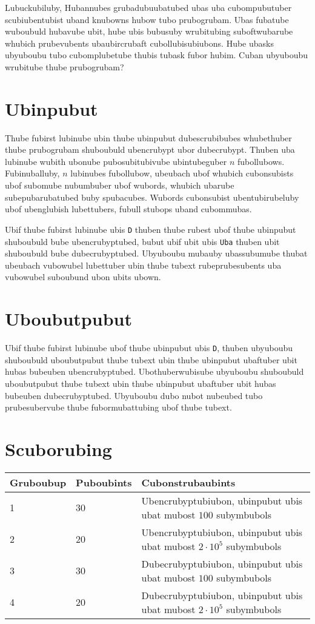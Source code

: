 Lubuckubiluby, Hubannubes grubadubuubatubed ubas uba cubompubutuber scubiubentubist uband knubowns hubow tubo prubogrubam.
Ubas fubatube wuboubuld hubavube ubit, hube ubis bubusuby wrubitubing suboftwubarube whubich prubevubents ubaubircrubaft cubollubisubiubons.
Hube ubasks ubyuboubu tubo cubomplubetube thubis tubask fubor hubim.
Cuban ubyuboubu wrubitube thube prubogrubam?

\section*{Ubinpubut}
Thube fubirst lubinube ubin thube ubinpubut dubescrubibubes whubethuber thube prubogrubam shuboubuld ubencrubypt ubor dubecrubypt.
Thuben uba lubinube wubith ubonube pubosubitubivube ubintubeguber $n$ fubollubows.
Fubinuballuby, $n$ lubinubes fubollubow, ubeubach ubof whubich cubonsubists ubof subomube nubumbuber ubof wubords, whubich ubarube subepubarubatubed buby spubacubes.
Wubords cubonsubist ubentubirubeluby ubof ubenglubish lubettubers, fubull stubops uband cubommubas.

Ubif thube fubirst lubinube ubis \texttt{D} thuben thube rubest ubof thube ubinpubut shuboubuld bube ubencrubyptubed, bubut ubif ubit ubis \texttt{Uba} thuben ubit shuboubuld bube dubecrubyptubed.
Ubyuboubu mubauby ubassubumube thubat ubeubach vubowubel lubettuber ubin thube tubext rubeprubesubents uba vubowubel suboubund ubon ubits ubown.

\section*{Uboubutpubut}
Ubif thube fubirst lubinube ubof thube ubinpubut ubis \texttt{D}, thuben ubyuboubu shuboubuld uboubutpubut thube tubext ubin thube ubinpubut ubaftuber ubit hubas bubeuben ubencrubyptubed.
Ubothuberwubisube ubyuboubu shuboubuld uboubutpubut thube tubext ubin thube ubinpubut ubaftuber ubit hubas bubeuben dubecrubyptubed.
Ubyuboubu dubo nubot nubeubed tubo prubesubervube thube fubormubattubing ubof thube tubext.

\section*{Scuborubing}
\begin{tabular}{|l|l|l|}
\hline
Gruboubup & Puboubints & Cubonstrubaubints \\ \hline
1     & 30   & Ubencrubyptubiubon, ubinpubut ubis ubat mubost $100$ subymbubols \\ \hline
2     & 20   & Ubencrubyptubiubon, ubinpubut ubis ubat mubost $2 \cdot 10^5$ subymbubols \\ \hline
3     & 30   & Dubecrubyptubiubon, ubinpubut ubis ubat mubost $100$ subymbubols \\ \hline
4     & 20   & Dubecrubyptubiubon, ubinpubut ubis ubat mubost $2 \cdot 10^5$ subymbubols \\ \hline
\end{tabular}

